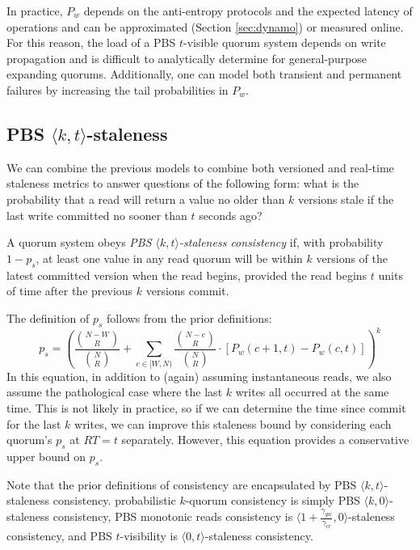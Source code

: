 \documentclass{vldb}
\begin{document}
In practice, $P_w$ depends on the anti-entropy protocols and the
expected latency of operations and can be approximated (Section
\ref{sec:dynamo}) or measured online.  For this reason, the load of a
PBS $t$-visible quorum system depends on write propagation and is
difficult to analytically determine for general-purpose expanding
quorums.  Additionally, one can model both transient and permanent
failures by increasing the tail probabilities in $P_w$.


\subsection{PBS $\langle k, t \rangle$-staleness}

We can combine the previous models to combine both versioned and
real-time staleness metrics to answer questions of the following form:
what is the probability that a read will return a value no older than
$k$ versions stale if the last write committed no sooner than $t$ seconds
ago?
\begin{definition}
A quorum system obeys \textit{PBS $\langle k, t \rangle$-staleness
  consistency} if, with probability $1-p_{s}$, at least one value in
any read quorum will be within $k$ versions of the latest committed
version when the read begins, provided the read begins $t$ units of
time after the previous $k$ versions commit.
\end{definition}
The definition of $p_{s}$ follows from the prior definitions:
\begin{equation}
p_{s} = \left(\frac{{N-W \choose R}}{{N \choose R}}+\sum_{c\in[W, N)} \frac{{N-c \choose R}}{{N \choose R}} \cdot [P_w(c+1, t)-P_w(c,t)]\right)^k
\end{equation}
In this equation, in addition to (again) assuming instantaneous reads,
we also assume the pathological case where the last $k$ writes all
occurred at the same time.  This is not likely in practice, so if we
can determine the time since commit for the last $k$ writes, we can
improve this staleness bound by considering each quorum's $p_{s}$
at $RT=t$ separately.  However, this equation provides a conservative
upper bound on $p_{s}$.

Note that the prior definitions of consistency are encapsulated by PBS
$\langle k, t \rangle$-staleness consistency. probabilistic $k$-quorum
consistency is simply PBS $\langle k, 0 \rangle$-staleness consistency,
PBS monotonic reads consistency is $\langle
1+\frac{\gamma_{gw}}{\gamma_{cr}}, 0 \rangle$-staleness consistency, and
PBS $t$-visibility is $\langle 0, t \rangle$-staleness consistency.
\end{document}
